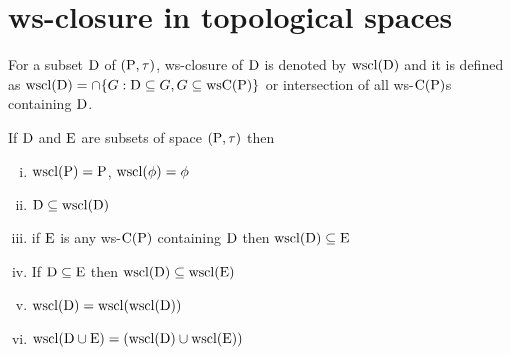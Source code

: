\section{ws-closure in topological spaces}\label{sec2.4}

\begin{dfn}\label{defi2.4.1} 
For a subset $\mathrm{D}$ of $(\mathrm{P}, \tau)$, ws-closure of $\mathrm{D}$ is denoted by $\mathrm{wscl}(\mathrm{D})$ and it is defined as $\mathrm{wscl}(\mathrm{D})=\cap \{G: \mathrm{D}\subseteq G, G\subseteq \mbox{ws}\mathrm{C}(\mathrm{P})\}$ or intersection of all ws-$\mathrm{C}(\mathrm{P})$s containing $\mathrm{D}$.
\end{dfn}

\begin{thm}\label{thm2.4.2}
If $\mathrm{D}$ and $\mathrm{E}$  are subsets of space $(\mathrm{P}, \tau)$ then
\begin{enumerate}[(i)]
\item $\mathrm{wscl}(\mathrm{P})=\mathrm{P}$, $\mathrm{wscl}(\phi)=\phi$
\item $\mathrm{D}\subseteq \mathrm{wscl}(\mathrm{D})$
\item if $\mathrm{E}$ is any ws-$\mathrm{C}(\mathrm{P})$ containing $\mathrm{D}$ then $\mathrm{wscl}(\mathrm{D})\subseteq \mathrm{E}$
\item If $\mathrm{D}\subseteq \mathrm{E}$ then $\mathrm{wscl}(\mathrm{D})\subseteq \mathrm{wscl}(\mathrm{E})$
\item $\mathrm{wscl}(\mathrm{D})=\mathrm{wscl}(\mathrm{wscl}(\mathrm{D}))$
\item $\mathrm{wscl}(\mathrm{D}\cup \mathrm{E})=(\mathrm{wscl}(\mathrm{D})\cup \mathrm{wscl}(\mathrm{E}))$
\end{enumerate}
\end{thm}

